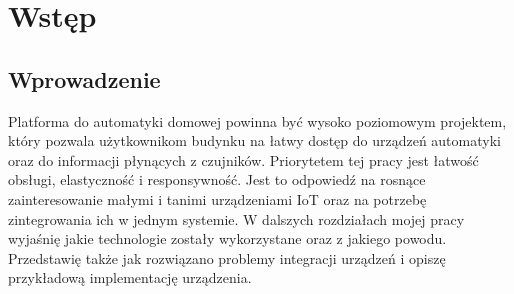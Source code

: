 \chapter{Wstęp}
\section{Wprowadzenie}
Platforma do automatyki domowej powinna być wysoko poziomowym projektem, który pozwala użytkownikom budynku na łatwy dostęp do urządzeń automatyki oraz do informacji płynących z czujników. Priorytetem tej pracy jest łatwość obsługi, elastyczność i responsywność. Jest to odpowiedź na rosnące zainteresowanie małymi i tanimi urządzeniami IoT oraz na potrzebę zintegrowania ich w jednym systemie. W dalszych rozdziałach mojej pracy wyjaśnię jakie technologie zostały wykorzystane oraz z jakiego powodu.  Przedstawię także jak rozwiązano problemy integracji urządzeń i opiszę przykładową implementację urządzenia.